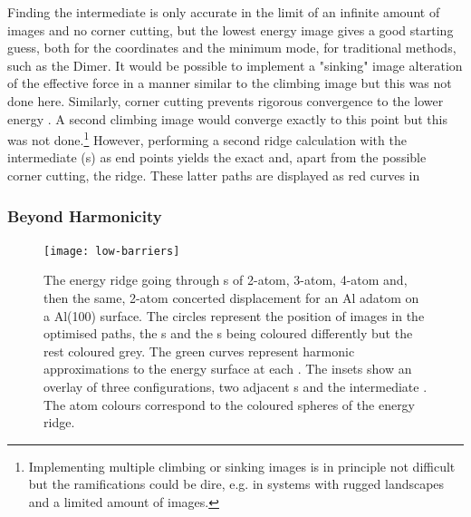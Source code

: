 Finding the intermediate  is only accurate in the limit of an infinite amount of images and no corner cutting, but the lowest energy image gives a good starting guess, both for the coordinates and the minimum mode, for traditional  methods, such as the Dimer.
It would be possible to implement a "sinking" image alteration of the effective force in a manner similar to the climbing image but this was not done here.
Similarly, corner cutting prevents rigorous convergence to the lower energy .
A second climbing image would converge exactly to this point but this was not done.\footnote{Implementing multiple climbing or sinking images is in principle not difficult but the ramifications could be dire, e.g. in systems with rugged landscapes and a limited amount of images.}
However, performing a second ridge calculation with the intermediate (s) as end points yields the exact  and, apart from the possible corner cutting, the ridge.
These latter paths are displayed as red curves in 

\subsubsection{Beyond Harmonicity}
\begin{figure}[hp]
\begin{center}
\texttt{[image: low-barriers]}
\caption{
The energy ridge going through s of 2-atom, 3-atom, 4-atom and, then the same, 2-atom concerted displacement for an Al adatom on a Al(100) surface.
The circles represent the position of images in the optimised paths, the s and the s being coloured differently but the rest coloured grey.
The green curves represent harmonic approximations to the energy surface at each .
The insets show an overlay of three configurations, two adjacent s and the intermediate .
The atom colours correspond to the coloured spheres of the energy ridge.
}
\label{fig:low-barriers}
\end{center}
\end{figure}

